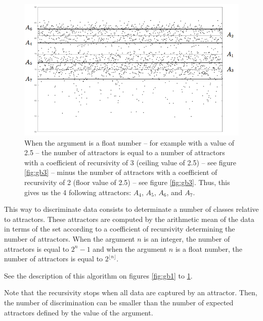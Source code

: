 \begin{figure}[!hbt]
	\begin{center}
		\includegraphics[scale=0.4]{img/1268}
		\caption{When the argument is a float number -- for example with a value of 2.5 -- the number of attractors is equal to a number of attractors with a coefficient of recursivity of 3 (ceiling value of 2.5) -- see figure \ref{fig:gb3} -- minus the number of attractors with a coefficient of recursivity of 2 (floor value of 2.5) -- see figure \ref{fig:gb3}. Thus, this gives us the 4 following attractors: $A_4$, $A_5$, $A_6$, and $A_7$.}
		\label{fig:gb4}
	\end{center}
\end{figure}

This way to discriminate data consists to determinate a number of classes relative to attractors. These attractors are computed by the arithmetic mean of the data in terms of the set according to a coefficient of recursivity determining the number of attractors. When the argument $n$ is an integer, the number of attractors is equal to $2^n - 1$ and when the argument $n$ is a float number, the number of attractors is equal to $2^{\lfloor n \rfloor}$.

\bigskip

See the description of this algorithm on figures \ref{fig:gb1} to \ref{fig:gb4}.

\noindent
\begin{info}
\begin{minipage}{0.95\textwidth}
\vspace{0.25cm}
Note that the recursivity stops when all data are captured by an attractor. Then, the number of discrimination can be smaller than the number of expected attractors defined by the value of the argument.%
\vspace{0.25cm}
\end{minipage}
\end{info}

